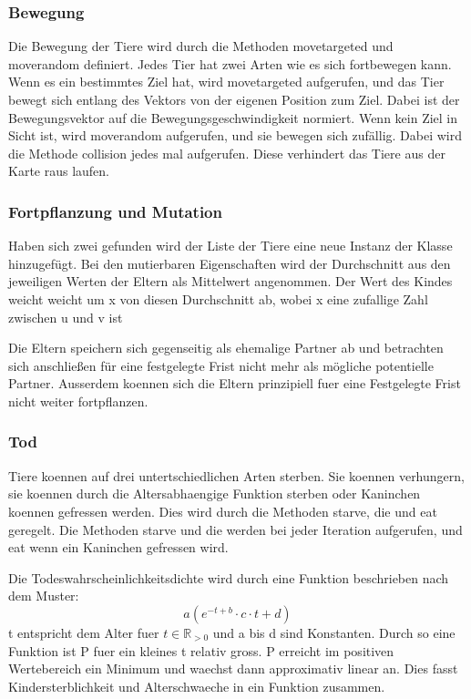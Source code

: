\documentclass[12pt]{article}
\begin{document}
\subsubsection{Bewegung}
Die Bewegung der Tiere wird durch die Methoden \colorbox{gray!40}{movetargeted}
und \colorbox{gray!40}{moverandom} definiert.
Jedes Tier hat zwei Arten wie es sich fortbewegen kann.
Wenn es ein bestimmtes Ziel hat, wird \colorbox{gray!40}{movetargeted}
aufgerufen, und das Tier bewegt sich entlang des Vektors von der eigenen Position zum Ziel.
Dabei ist der Bewegungsvektor auf die Bewegungsgeschwindigkeit normiert.
Wenn kein Ziel in Sicht ist, wird \colorbox{gray!40}{moverandom} aufgerufen, und sie bewegen sich zufällig.
Dabei wird die Methode \colorbox{gray!40}{collision} jedes mal aufgerufen.
Diese verhindert das Tiere aus der Karte raus laufen.
\subsubsection{Fortpflanzung und Mutation}
Haben sich zwei gefunden wird der Liste der Tiere eine neue Instanz der Klasse hinzugefügt.
Bei den mutierbaren Eigenschaften wird der Durchschnitt aus den jeweiligen Werten der Eltern als Mittelwert angenommen.
Der Wert des Kindes weicht weicht um x von diesen Durchschnitt ab, wobei x eine zufallige Zahl zwischen u und v ist

Die Eltern speichern sich gegenseitig als ehemalige Partner ab und betrachten
sich anschließen für eine festgelegte Frist nicht mehr als mögliche potentielle
Partner. Ausserdem koennen sich die Eltern prinzipiell fuer eine Festgelegte Frist nicht weiter fortpflanzen.
\subsubsection{Tod}
Tiere koennen auf drei untertschiedlichen Arten sterben.
Sie koennen verhungern, sie koennen durch die Altersabhaengige Funktion sterben
oder Kaninchen koennen gefressen werden.
Dies wird durch die Methoden \colorbox{gray!40}{starve}, \colorbox{gray!40}{die}
und \colorbox{gray!40}{eat} geregelt.
Die Methoden \colorbox{gray!40}{starve} und \colorbox{gray!40}{die} werden bei
jeder Iteration aufgerufen, und \colorbox{gray!40}{eat} wenn ein Kaninchen gefressen wird.

Die Todeswahrscheinlichkeitsdichte wird durch eine Funktion beschrieben nach dem Muster:
\begin{equation}
    a ( {e}^{-t + b} \cdot c \cdot t + d)
\end{equation}
t entspricht dem Alter fuer $t \in \mathbb{R}_{>0}$  und a bis d sind Konstanten.
Durch so eine Funktion ist P fuer ein kleines t relativ gross.
P erreicht im positiven Wertebereich ein Minimum und waechst dann approximativ linear an.
Dies fasst Kindersterblichkeit und Alterschwaeche in ein Funktion zusammen.
\end{document}
